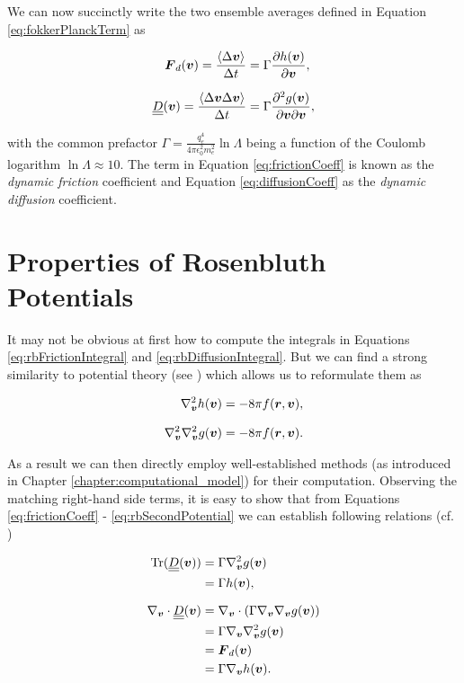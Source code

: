 We can now succinctly write the two ensemble averages defined in Equation \ref{eq:fokkerPlanckTerm}
as

\begin{align}
    \vect F_d(\vect v) = \frac{\langle \Delta \vect v \rangle}{\Delta t} &= \Gamma \frac{\partial h(\vect
    v)}{\partial \vect v}, \label{eq:frictionCoeff} \eqVspace
    \matr D(\vect v) = \frac{\langle \Delta \vect v \Delta \vect v \rangle}{\Delta t} &= \Gamma
    \frac{\partial^2 g(\vect v)}{\partial \vect v \partial \vect v}, \label{eq:diffusionCoeff} 
\end{align}

with the common prefactor $\Gamma = \frac{q_e^4}{4\pi \epsilon_0^2 m_e^2} \ln{\Lambda}$ being a
function of the Coulomb logarithm $\ln \Lambda \approx 10$.
The term in Equation \ref{eq:frictionCoeff} is known as the \emph{dynamic friction} coefficient and Equation
\ref{eq:diffusionCoeff} as the \emph{dynamic diffusion} coefficient.

\section{Properties of Rosenbluth Potentials}
\label{section:rb_potentials}

It may not be obvious at first how to compute the integrals in Equations \ref{eq:rbFrictionIntegral} and
\ref{eq:rbDiffusionIntegral}. But we can find a strong similarity to potential theory (see
\cite{Callend2018Chapter223}) which allows us to reformulate them as

\begin{align}
    \velNabla^2 h(\vect v) &= -8 \pi f(\vect r, \vect v), \label{eq:rbFirstPotential} \eqVspace
    \velNabla^2 \velNabla^2 g(\vect v) &= -8 \pi f(\vect r, \vect v). \label{eq:rbSecondPotential}
\end{align}

As a result we can then directly employ well-established methods (as introduced in Chapter
\ref{chapter:computational_model}) for their computation.
Observing the matching right-hand side terms, it is easy to show that from Equations
\ref{eq:frictionCoeff} - \ref{eq:rbSecondPotential} we can establish following relations (cf.
\cite{FPOhakim})

\begin{equation}
    \begin{aligned}
        \text{Tr}(\matr D(\vect v)) &= \Gamma \velNabla^2 g(\vect v) \\
                                    &= \Gamma h(\vect v), \eqVspace
        \velNabla \cdot \matr D(\vect v) &= \velNabla \cdot (\Gamma \velNabla \velNabla g(\vect v)) \\
                                      &= \Gamma \velNabla \velNabla^2 g(\vect v) \\
                                      &= \vect F_d(\vect v) \\
                                      &= \Gamma \velNabla h(\vect v).
    \end{aligned}
    \label{eq:rb_identities}
\end{equation}

